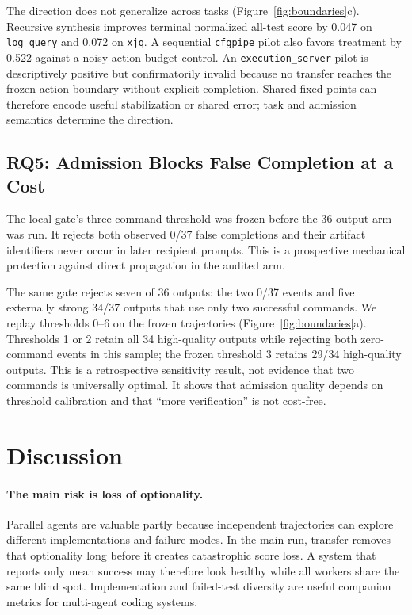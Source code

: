 \documentclass[letterpaper]{article}
\begin{document}
The direction does not generalize across tasks
(Figure~\ref{fig:boundaries}c). Recursive synthesis improves terminal normalized
all-test score by 0.047 on \texttt{log\_query} and 0.072 on \texttt{xjq}. A
sequential \texttt{cfgpipe} pilot also favors treatment by 0.522 against a noisy
action-budget control. An \texttt{execution\_server} pilot is descriptively
positive but confirmatorily invalid because no transfer reaches the frozen action
boundary without explicit completion. Shared fixed points can therefore encode
useful stabilization or shared error; task and admission semantics determine the
direction.

\subsection{RQ5: Admission Blocks False Completion at a Cost}

The local gate's three-command threshold was frozen before the 36-output arm was
run. It rejects both observed 0/37 false completions and their artifact identifiers
never occur in later recipient prompts. This is a prospective mechanical
protection against direct propagation in the audited arm.

The same gate rejects seven of 36 outputs: the two 0/37 events and five externally
strong 34/37 outputs that use only two successful commands. We replay thresholds
0--6 on the frozen trajectories (Figure~\ref{fig:boundaries}a). Thresholds 1 or
2 retain all 34 high-quality outputs while rejecting both zero-command events in
this sample; the frozen threshold 3 retains 29/34 high-quality outputs. This is a
retrospective sensitivity result, not evidence that two commands is universally
optimal. It shows that admission quality depends on threshold calibration and that
``more verification'' is not cost-free.

\section{Discussion}

\paragraph{The main risk is loss of optionality.}
Parallel agents are valuable partly because independent trajectories can explore
different implementations and failure modes. In the main run, transfer removes
that optionality long before it creates catastrophic score loss. A system that
reports only mean success may therefore look healthy while all workers share the
same blind spot. Implementation and failed-test diversity are useful companion
metrics for multi-agent coding systems.
\end{document}
